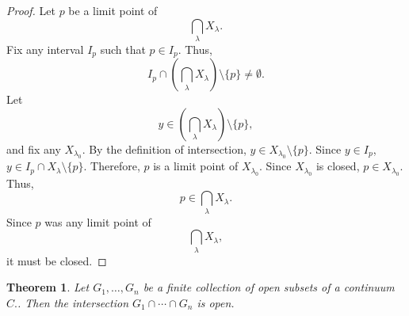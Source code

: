 \documentclass{amsart}
\newtheorem{theorem}{Theorem}
\newcommand{\1}{\mathds{1}}
\numberwithin{equation}{section}
\numberwithin{theorem}{section}
\begin{document}
\begin{proof}
	Let $p$ be a limit point of $$\bigcap_{\lambda} X_{\lambda}.$$ Fix any interval $I_p$ such that $p\in I_p$. Thus, $$I_p \cap \left( \bigcap_{\lambda} X_{\lambda} \right) \setminus \{p\} \not= \emptyset.$$
	Let $$y\in \left( \bigcap_{\lambda} X_{\lambda} \right) \setminus \{p\},$$
	and fix any $X_{\lambda_0}$. By the definition of intersection, $y\in X_{\lambda_0}\setminus \{p\}$. Since $y\in I_p$, $y\in I_p \cap X_{\lambda}\setminus \{p\}$. Therefore, $p$ is a limit point of $X_{\lambda_0}$. Since $X_{\lambda_0}$ is closed, $p\in X_{\lambda_0}$. Thus, $$p\in \bigcap_{\lambda} X_{\lambda}.$$ Since $p$ was any limit point of  $$\bigcap_{\lambda} X_{\lambda},$$ it must be closed.
\end{proof}

\begin{theorem} \label{*} Let $G_1, \dotsc, G_n$ be a finite collection of open subsets of a continuum $C.$.  Then the intersection $G_1 \cap \dotsm \cap G_n$ is open.
\end{theorem}
\end{document}
